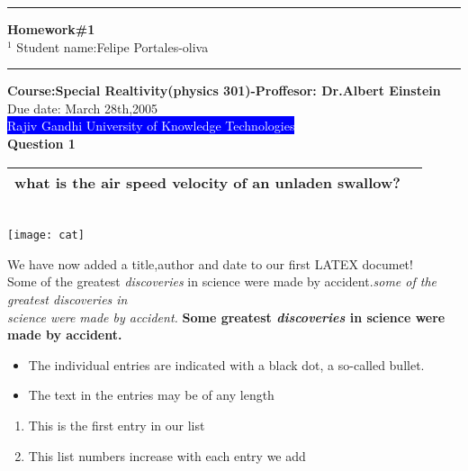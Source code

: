 \documentclass{article}
\begin{document}
\hrule
\vspace{2mm}
\begin{center}
\textbf{\huge{Homework{\LARGE{\#}}1}}\\
\vspace{1mm}
$^1$  \footnotesize{Student name:Felipe Portales-oliva}\\
\vspace{2mm}
\hrule
\vspace{2mm}
\textbf{\footnotesize{Course:Special Realtivity(physics 301)-Proffesor: Dr.Albert Einstein}}\\
\vspace{1mm}
Due date: March 28th,2005\\
\vspace{1mm}
\colorbox{blue}{\textcolor{white}{Rajiv Gandhi University of Knowledge Technologies}}\\
\vspace{1mm}
\textbf{Question 1}\\
\begin{tabular}{|c c|}
\hline
what is the air speed velocity of an unladen swallow?&\hspace{8mm}\\
\hline
\end{tabular}\\
\vspace{3mm}
\texttt{[image: cat]}
\end{center}
\vspace{2mm}
We have now added a title,author and date to our first LATEX documet!\\
Some of the greatest \textit{discoveries} in science were made by accident.\textsl{some of the greatest discoveries in\\ science were made by accident.}
\textbf{Some greatest \textit{discoveries} in science were made by accident.}\\
\begin{center}
\begin{itemize}
\item The individual entries are indicated with a black dot, a so-called bullet.
\item The text in the entries may be of any length
\end{itemize}
\begin{enumerate}
\item This is the first entry in our list
\item This list numbers increase with each entry we add
\end{enumerate}
\end{center}
\end{document}
